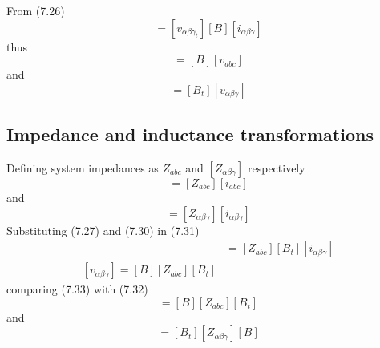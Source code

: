 \documentclass[a4paper,numbers=noenddot,12pt]{scrbook}
\begin{document}
    From (7.26)
    \begin{equation*}
        [v_{abc_{t}}][i_{abc}] = [v_{\alpha \beta \gamma_{t}}][B][i_{\alpha \beta \gamma}]
        \label{}
    \end{equation*}
    thus
    \begin{equation}
        [v_{\alpha \beta \gamma}] = [B] [v_{abc}]
        \label{eq:Eq7.29}
    \end{equation}
    and
    \begin{equation}
        [v_{abc}] = [B_t] [v_{\alpha \beta \gamma}]
        \label{eq:Eq7.30}
    \end{equation}

    \subsection{Impedance and inductance transformations}
    Defining system impedances as $Z_{abc}$ and $[Z_{\alpha \beta \gamma}]$ respectively
    \begin{equation}
        [v_{abc}] = [Z_{abc}] [i_{abc}]
        \label{eq:Eq7.31}
    \end{equation}
    and
    \begin{equation}
        [v_{\alpha \beta \gamma}] = [Z_{\alpha \beta \gamma}] [i_{\alpha \beta \gamma}]
        \label{eq:Eq7.32}
    \end{equation}
    Substituting (7.27) and (7.30) in (7.31)
    \begin{align}
        [B_t][v_{\alpha \beta \gamma}] & =[Z_{abc}] [B_t] [i_{\alpha \beta \gamma}] \nonumber \\
        [v_{\alpha \beta \gamma}] = [B][Z_{abc}][B_t]
        \label{eq:Eq7.33}
    \end{align}
    comparing (7.33) with (7.32)
    \begin{equation}
        [Z_{\alpha \beta \gamma}] = [B][Z_{abc}] [B_t]
        \label{eq:7.34}
    \end{equation}
    and
    \begin{equation}
        [Z_{abc}] = [B_t] [Z_{\alpha \beta \gamma}][B]
        \label{eq:Eq7.35}
    \end{equation}
\end{document}
